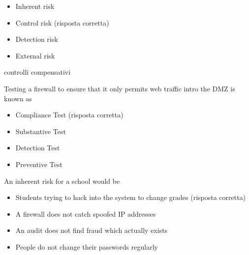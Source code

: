 \begin{itemize}
\item Inherent risk
\item Control risk (risposta corretta)
\item Detection risk
\item External risk
\end{itemize}

controlli compensativi


Testing a firewall to ensure that it only permits web traffic intro the DMZ is
known as

\begin{itemize}
\item Compliance Test (risposta corretta)
\item Substantive Test
\item Detection Test
\item Preventive Test
\end{itemize}


An inherent risk for a school would be

\begin{itemize}
\item Students trying to hack into the system to change grades (risposta
corretta)
\item A firewall does not catch spoofed IP addresses
\item An audit does not find fraud which actually exists
\item People do not change their passwords regularly
\end{itemize}


